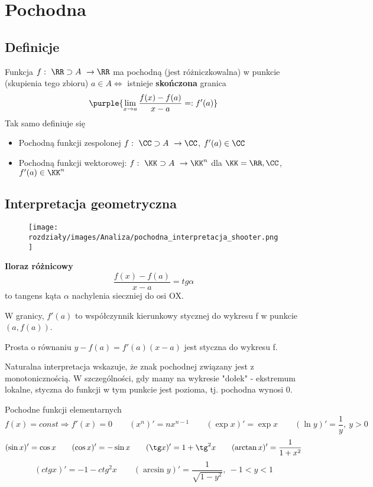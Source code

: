 \section{Pochodna}
\subsection{Definicje}
Funkcja $f: \ \RR \supset A \ \to \RR$ ma pochodną (jest różniczkowalna) w punkcie (skupienia tego zbioru) $a \in A \Longleftrightarrow$ istnieje \textbf{skończona} granica
$$
\purple{\lim_{x\to a}\frac{f(x)-f(a)}{x-a} =: f'(a)}
$$
Tak samo definiuje się
\begin{itemize}
    \item Pochodną funkcji zespolonej $f: \ \CC \supset A \ \to \CC $, $f'(a) \in \CC$
    \item Pochodną funkcji wektorowej: $f: \ \KK \supset A \ \to \KK^n$ dla $\KK = \RR, \CC$, $f'(a)\in \KK^n$
\end{itemize}
\subsection{Interpretacja geometryczna}
\begin{figure}[h]
    \centering
    \texttt{[image: rozdziały/images/Analiza/pochodna\_interpretacja\_shooter.png]}
\end{figure}

\textbf{Iloraz różnicowy}
$$
\frac{f(x)-f(a)}{x-a} = tg \alpha 
$$
to tangens kąta $\alpha$ nachylenia sieczniej do osi OX.

W granicy, $f'(a)$ to współczynnik kierunkowy stycznej do wykresu f w punkcie $(a, f(a))$.

Prosta o równaniu $y-f(a)=f'(a)(x-a)$ jest styczna do wykresu f.

Naturalna interpretacja wskazuje, że znak pochodnej związany jest z monotonicznością. W szczególności, gdy mamy na wykresie "dołek" - ekstremum lokalne, styczna do funkcji w tym punkcie jest pozioma, tj. pochodna wynosi 0.

\begin{example}
    Pochodne funkcji elementarnych
    $$
    f(x)=const \Longrightarrow f'(x) = 0 \qquad (x^n)' = nx^{n-1} \qquad (\exp x)' = \exp x \qquad (\ln y)' = \frac{1}{y}, \ y > 0
    $$
    $$
    (\sin x)' = \cos x \qquad (\cos x)' = -\sin x \qquad (\tg x)' = 1 + \tg^2 x \qquad (\arctan x)' = \frac{1}{1+x^2}
    $$
    $$
    (ctg x)' = -1 - ctg^2x \qquad (\arcsin y)' = \frac{1}{\sqrt{1-y^2}} , \ -1 < y < 1
    $$
\end{example}

